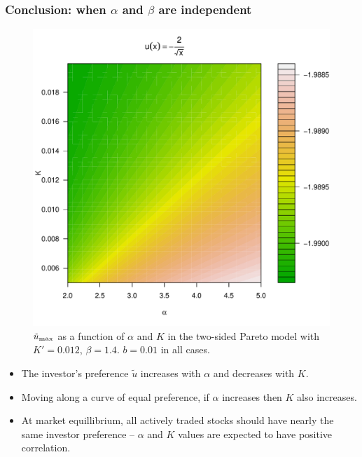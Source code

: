 \documentclass{beamer}
\begin{document}
\begin{frame}
  \frametitle{Conclusion: when $\alpha$ and  $\beta$ are independent}
  \begin{minipage}[t]{0.5\linewidth}
    \begin{figure}[htb!]
      \includegraphics[width=\textwidth]{preference_pareto5e-1_A.pdf}
      \caption{\scriptsize
        $\tilde u_{\rm max}$ as a function of $\alpha$ and $K$
        in the two-sided Pareto model with $K'=0.012$, $\beta = 1.4$.
        $b = 0.01$ in all cases.
      }
    \end{figure}
  \end{minipage}\hfill
  \begin{minipage}[t]{0.5\linewidth}
    \begin{small}
      \begin{itemize}
      \item The investor's preference $\tilde u$ increases with $\alpha$ and
        decreases with $K$.
      \item Moving along a curve of equal preference, if $\alpha$
        increases then $K$ also increases.
      \item At market equillibrium, all actively traded stocks should
        have nearly the same investor preference -- $\alpha$ and
        $K$ values are expected to have positive correlation.
      \end{itemize}
    \end{small}
  \end{minipage}
\end{frame}
\end{document}

